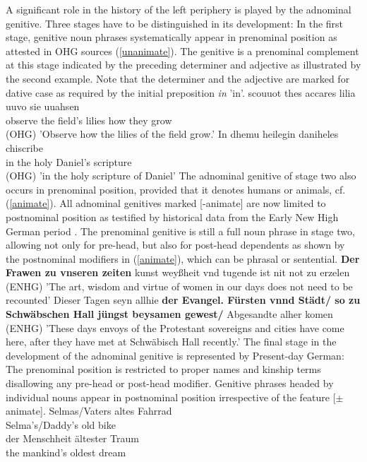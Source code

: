 \documentclass[output=paper]{langsci/langscibook}
\begin{document}
A significant role in the history of the left periphery is played by the adnominal genitive. Three stages have to be distinguished in its development: In the first stage, genitive noun phrases systematically appear in prenominal position as attested in OHG sources (\ref{unanimate}). The genitive is a prenominal complement at this stage indicated by the preceding determiner and adjective as illustrated by the second example. Note that the determiner and the adjective are marked for dative case as required by the initial preposition \textit{in} 'in'.
\eal \label{unanimate}
\ex 
\gll scouuot thes accares lilia uuvo sie uuahsen \\ observe the field's lilies how they grow \\  \hfill (OHG)
\glt 'Observe how the lilies of the field grow.'
\ex 
\gll In dhemu heilegin daniheles chiscribe \\ in the holy Daniel's scripture  \\  \hfill (OHG)
\glt 'in the holy scripture of Daniel'
\zl
The adnominal genitive of stage two also occurs in prenominal position, provided that it denotes humans or animals, cf. (\ref{animate}). All adnominal genitives marked [-animate] are now limited to postnominal position as testified by historical data from the Early New High German period \citep{ebert88}. The prenominal genitive is still a full noun phrase in stage two, allowing not only for pre-head, but also for post-head dependents as shown by the postnominal modifiers in (\ref{animate}), which can be phrasal or sentential.
\eal \label{animate}
\ex \textbf{Der Frawen zu vnseren zeiten} kunst weyßheit vnd tugende ist nit not zu erzelen \hfill (ENHG)
\glt 'The art, wisdom and virtue of women in our days does not need to be recounted'
\ex Dieser Tagen seyn allhie \textbf{der Evangel. Fürsten vnnd Städt/ so zu Schwäbschen Hall jüngst beysamen gewest/} Abgesandte alher komen \hfill (ENHG)
\glt 'These days envoys of the Protestant sovereigns and cities have come here, after they have met at Schwäbisch Hall recently.'	
\zl
The final stage in the development of the adnominal genitive is represented by Present-day German: The prenominal position is restricted to proper names and kinship terms disallowing  any pre-head or post-head modifier. Genitive phrases headed by individual nouns appear in postnominal position irrespective of the feature [$\pm$animate].
\eal
\ex
\gll Selmas/Vaters altes Fahrrad \\ Selma's/Daddy's old bike\\
\ex
\gll *der Menschheit ältester Traum \\ the mankind's oldest dream \\
\zl
\end{document}
